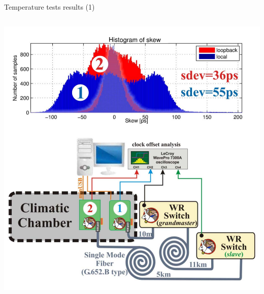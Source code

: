 \documentclass[compress,red]{beamer}
\begin{document}
\begin{frame}{Temperature tests results (1)}
\begin{columns}[c]
		\hspace{-0.8cm}
		\begin{center}
		\includegraphics[width=1.13\textwidth]{measurements/tempTests-2-combo.pdf}
		\end{center}


\end{columns}
\end{frame}
\end{document}
